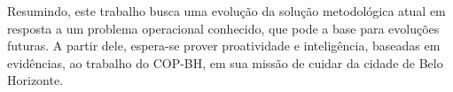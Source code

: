 Resumindo, este trabalho busca uma evolução da solução metodológica atual em resposta a um problema operacional conhecido, que pode a base para evoluções futuras. A partir dele, espera-se prover proatividade e inteligência, baseadas em evidências, ao trabalho do COP-BH, em sua missão de cuidar da cidade de Belo Horizonte.
